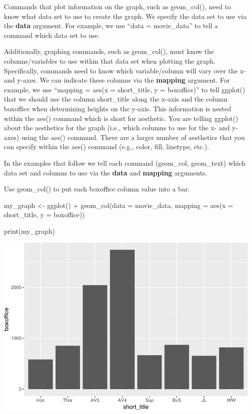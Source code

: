 \documentclass[
]{krantz}
\makeatletter
\newenvironment{Shaded}{\begin{snugshade}}{\end{snugshade}}
\newcommand{\AttributeTok}[1]{\textcolor[rgb]{0.61,0.61,0.61}{#1}}
\newcommand{\FunctionTok}[1]{\textcolor[rgb]{0,0,0}{#1}}
\newcommand{\NormalTok}[1]{#1}
\newcommand{\OtherTok}[1]{\textcolor[rgb]{0.37,0.37,0.37}{#1}}
\newcommand{\SpecialCharTok}[1]{\textcolor[rgb]{0,0,0}{#1}}
\newenvironment{kframe}{%
\medskip{}
\setlength{\fboxsep}{.8em}
 \def\at@end@of@kframe{}%
 \ifinner\ifhmode%
  \def\at@end@of@kframe{\end{minipage}}%
  \begin{minipage}{\columnwidth}%
 \fi\fi%
 \def\FrameCommand##1{\hskip\@totalleftmargin \hskip-\fboxsep
 \colorbox{shadecolor}{##1}\hskip-\fboxsep
     \hskip-\linewidth \hskip-\@totalleftmargin \hskip\columnwidth}%
 \MakeFramed {\advance\hsize-\width
   \@totalleftmargin\z@ \linewidth\hsize
   \@setminipage}}%
 {\par\unskip\endMakeFramed%
 \at@end@of@kframe}
\renewenvironment{Shaded}{\begin{kframe}}{\end{kframe}}
\makeatother
\begin{document}
Commands that plot information on the graph, such as geom\_col(), need to know what data set to use to create the graph. We specify the data set to use via the \textbf{data} argument. For example, we use ``data = movie\_data'' to tell a command which data set to use.

Additionally, graphing commands, such as geom\_col(), must know the columns/variables to use within that data set when plotting the graph. Specifically, commands need to know which variable/column will vary over the x- and y-axes. We can indicate these columns via the \textbf{mapping} argument. For example, we use ``mapping = aes(x = short\_title, y = boxoffice)'' to tell ggplot() that we should use the column short\_title along the x-axis and the column boxoffice when determining heights on the y-axis. This information is nested within the aes() command which is short for aesthetic. You are telling ggplot() about the aesthetics for the graph (i.e., which columns to use for the x- and y-axes) using the aes() command. There are a larger number of aesthetics that you can specify within the aes() command (e.g., color, fill, linetype, etc.).

In the examples that follow we tell each command (geom\_col, geom\_text) which data set and columns to use via the \textbf{data} and \textbf{mapping} arguments.

Use geom\_col() to put each boxoffice column value into a bar.

\begin{Shaded}
\begin{Highlighting}[]
\NormalTok{my\_graph }\OtherTok{\textless{}{-}} \FunctionTok{ggplot}\NormalTok{() }\SpecialCharTok{+}
  \FunctionTok{geom\_col}\NormalTok{(}\AttributeTok{data =}\NormalTok{ movie\_data,}
           \AttributeTok{mapping =} \FunctionTok{aes}\NormalTok{(}\AttributeTok{x =}\NormalTok{ short\_title, }
                         \AttributeTok{y =}\NormalTok{ boxoffice))}

\FunctionTok{print}\NormalTok{(my\_graph)}
\end{Highlighting}
\end{Shaded}

\includegraphics[width=0.65\linewidth]{bookdown_files/figure-latex/unnamed-chunk-101-1}
\end{document}
